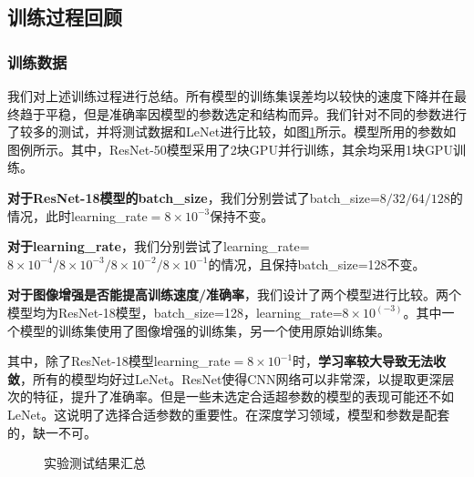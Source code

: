 \documentclass[hyperref, UTF8, 12pt]{article}
\theoremstyle{definition}
\begin{document}
\subsection{训练过程回顾}

\subsubsection{训练数据}
我们对上述训练过程进行总结。所有模型的训练集误差均以较快的速度下降并在最终趋于平稳，但是准确率因模型的参数选定和结构而异。我们针对不同的参数进行了较多的测试，并将测试数据和LeNet进行比较，如图\ref{fig:total}所示。模型所用的参数如图例所示。其中，ResNet-50模型采用了2块GPU并行训练，其余均采用1块GPU训练。

\textbf{对于ResNet-18模型的batch\_size}，我们分别尝试了batch\_size=$8/32/64/128$的情况，此时learning\_rate$=8\times 10^{-3}$保持不变。

\textbf{对于learning\_rate}，我们分别尝试了learning\_rate=$8\times 10^{-4}/8\times10^{-3}/8\times10^{-2}/8\times10^{-1}$的情况，且保持batch\_size=128不变。

\textbf{对于图像增强是否能提高训练速度/准确率}，我们设计了两个模型进行比较。两个模型均为ResNet-18模型，batch\_size=128，learning\_rate=$8\times10^(-3)$。其中一个模型的训练集使用了图像增强的训练集，另一个使用原始训练集。

其中，除了ResNet-18模型learning\_rate$=8\times 10^{-1}$时，\textbf{学习率较大导致无法收敛}，所有的模型均好过LeNet。ResNet使得CNN网络可以非常深，以提取更深层次的特征，提升了准确率。但是一些未选定合适超参数的模型的表现可能还不如LeNet。这说明了选择合适参数的重要性。在深度学习领域，模型和参数是配套的，缺一不可。
\begin{figure}[H]
	\centering
	\caption{实验测试结果汇总}
	\label{fig:total}
\end{figure}
\end{document}
